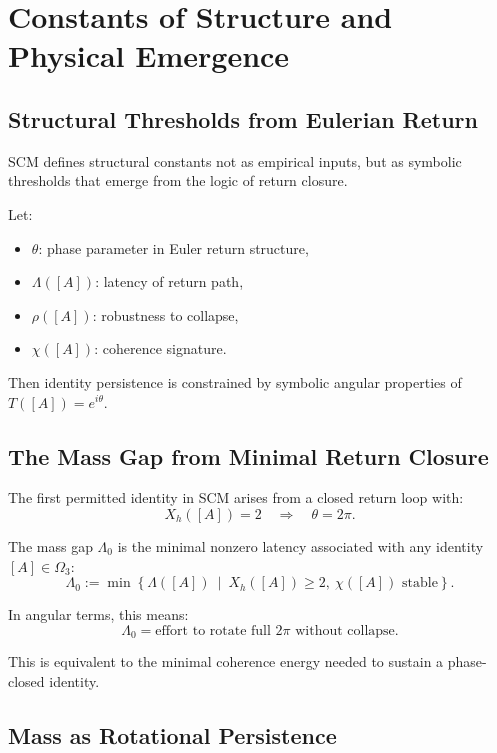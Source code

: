 \chapter{Constants of Structure and Physical Emergence} \label{chapter:constants-physical-emergence}

\section{Structural Thresholds from Eulerian Return}

SCM defines structural constants not as empirical inputs, but as symbolic thresholds that emerge from the logic of return closure.

Let:
\begin{itemize}
    \item $\theta$: phase parameter in Euler return structure,
    \item $\Lambda([A])$: latency of return path,
    \item $\rho([A])$: robustness to collapse,
    \item $\chi([A])$: coherence signature.
\end{itemize}

\noindent Then identity persistence is constrained by symbolic angular properties of $T([A]) = e^{i\theta}$.

\section{The Mass Gap from Minimal Return Closure}

The first permitted identity in SCM arises from a closed return loop with:
\[
X_h([A]) = 2 \quad \Rightarrow \quad \theta = 2\pi.
\]

\begin{definition}
The mass gap $\Lambda_0$ is the minimal nonzero latency associated with any identity $[A] \in \Omega_3$:
\[
\Lambda_0 := \min \left\{ \Lambda([A]) \ \middle| \ X_h([A]) \geq 2, \ \chi([A]) \text{ stable} \right\}.
\]
\end{definition}

\noindent In angular terms, this means:
\[
\Lambda_0 = \text{effort to rotate full $2\pi$ without collapse}.
\]

This is equivalent to the minimal coherence energy needed to sustain a phase-closed identity.

\section{Mass as Rotational Persistence}

